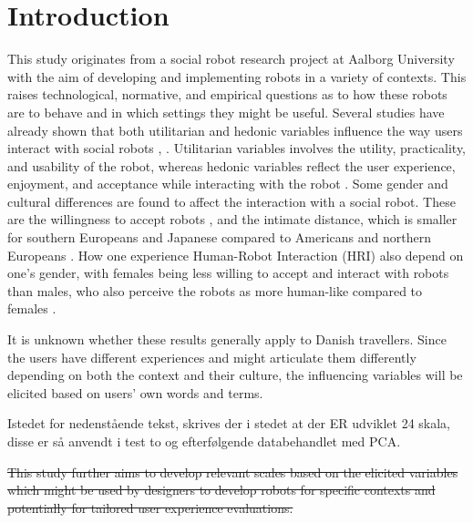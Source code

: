 \section{Introduction}
\label{Introduction}
%
This study originates from a social robot research project at Aalborg University with the aim of developing and implementing robots in a variety of contexts. This raises technological, normative, and empirical questions as to how these robots are to behave and in which settings they might be useful. Several studies have already shown that both utilitarian and hedonic variables influence the way users interact with social robots \cite{PDF:ExploringInfluencingVariable}, \cite{PDF:SharingALifeHarvey}. Utilitarian variables involves the utility, practicality, and usability of the robot, whereas hedonic variables reflect the user experience, enjoyment, and acceptance while interacting with the robot \cite{PDF:ExploringInfluencingVariable}. Some gender and cultural differences are found to affect the interaction with a social robot. These are the willingness to accept robots \cite{PDF:InTheCompanyofRobots}, and the intimate distance, which is smaller for southern Europeans and Japanese compared to Americans and northern Europeans \cite{PDF:HowMayIServeYou}. How one experience Human-Robot Interaction (HRI) also depend on one's gender, with females being less willing to accept and interact with robots than males, who also perceive the robots as more human-like compared to females \cite{PDF:ExploringInfluencingVariable}.

It is unknown whether these results generally apply to Danish travellers. Since the users have different experiences and might articulate them differently depending on both the context and their culture, the influencing variables will be elicited based on users' own words and terms.

{\color{red}Istedet for nedenstående tekst, skrives der i stedet at der ER udviklet 24 skala, disse er så anvendt i test to og efterfølgende databehandlet med PCA.}

\sout{This study further aims to develop relevant scales based on the elicited variables which might be used by designers to develop robots for specific contexts and potentially for tailored user experience evaluations.}



